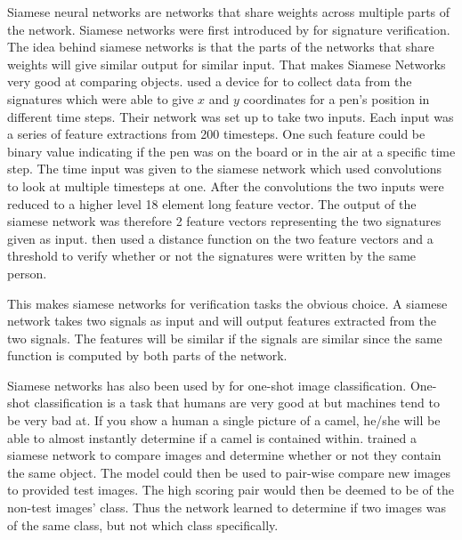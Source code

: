 Siamese neural networks are networks that share weights across multiple parts of
the network. Siamese networks were first introduced by \citet{NIPS1993_769} for
signature verification. The idea behind siamese networks is that the parts of
the networks that share weights will give similar output for similar input. That
makes Siamese Networks very good at comparing objects. \citet{NIPS1993_769} used
a device for to collect data from the signatures which were able to give $x$
and $y$ coordinates for a pen's position in different time steps. Their network
was set up to take two inputs. Each input was a series of feature extractions
from 200 timesteps. One such feature could be binary value indicating if the
pen was on the board or in the air at a specific time step. The time input
was given to the siamese network which used convolutions to look at multiple
timesteps at one. After the convolutions the two inputs were reduced to a
higher level 18 element long feature vector. The output of the siamese network
was therefore 2 feature vectors representing the two signatures given as input.
\citet{NIPS1993_769} then used a distance function on the two feature vectors
and a threshold to verify whether or not the signatures were written by the same
person.

This makes siamese networks for verification tasks the obvious choice. A siamese
network takes two signals as input and will output features extracted from the
two signals. The features will be similar if the signals are similar since the
same function is computed by both parts of the network.

Siamese networks has also been used by \citet{Koch2015SiameseNN} for one-shot
image classification. One-shot classification is a task that humans are very
good at but machines tend to be very bad at. If you show a human a single
picture of a camel, he/she will be able to almost instantly determine if a
camel is contained within.\citet{Koch2015SiameseNN} trained a siamese network
to compare images and determine whether or not they contain the same object.
The model could then be used to pair-wise compare new images to provided test
images. The high scoring pair would then be deemed to be of the non-test images'
class. Thus the network learned to determine if two images was of the same
class, but not which class specifically.


